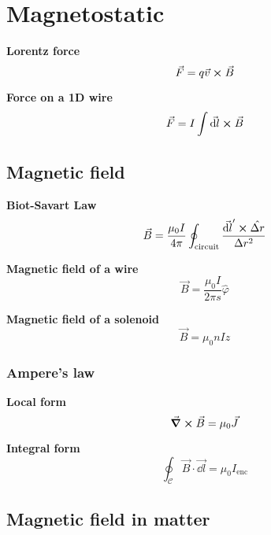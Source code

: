 \documentclass[10pt]{extarticle}
\numberwithin{equation}{section}
\begin{document}
\section{Magnetostatic}
\begin{multicols}{2}
    \textbf{Lorentz force}
    \begin{equation}
        \vec F = q \vec v \cross \vec B
    \end{equation}

    \textbf{Force on a 1D wire}
    \begin{equation}
        \vec F = I \int \vec{\dd l} \cross \vec B
    \end{equation}

    \subsection{Magnetic field}

    \textbf{Biot-Savart Law}
    \begin{equation}
        \vec B = \frac{\mu_0 I}{4 \pi} \oint_\text{circuit} \frac{\vec{\dd l}' \cross \hat{\Delta r}}{\Delta r^2}
    \end{equation}

    \textbf{Magnetic field of a wire}
    \begin{equation}
        \vec B = \frac{\mu_0 I}{2 \pi s} \hat \varphi
    \end{equation}

    \textbf{Magnetic field of a solenoid}
    \begin{equation}
        \vec B = \mu_0 n I \hat z
    \end{equation}

    \subsubsection{Ampere's law}
    \textbf{Local form}
    \begin{equation}
        \curl \vec B = \mu_0 \vec J
    \end{equation}

    \textbf{Integral form}
    \begin{equation}
        \oint_\mathcal{C} \vec B \cdot \vec{\dd l} = \mu_0 I_\text{enc}
    \end{equation}

    \subsection{Magnetic field in matter}


\end{multicols}
\end{document}
